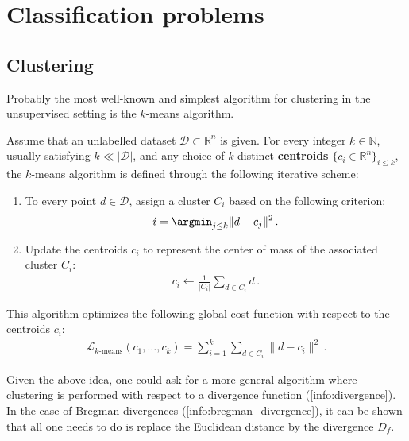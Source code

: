 \section{Classification problems}
\subsection{Clustering}

    Probably the most well-known and simplest algorithm for clustering in the unsupervised setting is the $k$-means algorithm.
    \begin{method}
        Assume that an unlabelled dataset $\mathcal{D}\subset\mathbb{R}^n$ is given. For every integer $k\in\mathbb{N}$, usually satisfying $k\ll|\mathcal{D}|$, and any choice of $k$ distinct \textbf{centroids} $\{c_i\in\mathbb{R}^n\}_{i\leq k}$, the $k$-means algorithm is defined through the following iterative scheme:
        \begin{enumerate}
            \item To every point $d\in\mathcal{D}$, assign a cluster $C_i$ based on the following criterion:
            \begin{gather}
                i = \argmin_{j\leq k}\|d-c_j\|^2\,.
            \end{gather}
            \item Update the centroids $c_i$ to represent the center of mass of the associated cluster $C_i$:
            \begin{gather}
                c_i\longleftarrow\frac{1}{|C_i|}\sum_{d\in C_i}d\,.
            \end{gather}
        \end{enumerate}
        This algorithm optimizes the following global cost function with respect to the centroids $c_i$:
        \begin{gather}
            \mathcal{L}_{k\text{-means}}(c_1,\ldots,c_k) = \sum_{i=1}^k\sum_{d\in C_i}\|d - c_i\|^2\,.
        \end{gather}
    \end{method}
    Given the above idea, one could ask for a more general algorithm where clustering is performed with respect to a divergence function (\cref{info:divergence}). In the case of Bregman divergences (\cref{info:bregman_divergence}), it can be shown that all one needs to do is replace the Euclidean distance by the divergence $D_f$.

